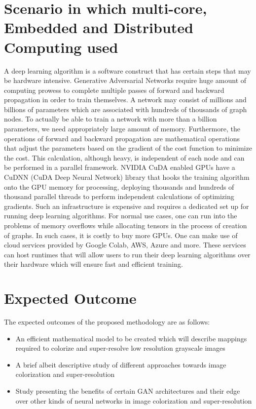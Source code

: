 \documentclass[oneside,a4paper,12pt]{report}
\begin{document}
\section{Scenario in which multi-core, Embedded and Distributed Computing used}
\hspace*{0.25 in}A deep learning algorithm is a software construct that has certain steps that may be hardware intensive. Generative Adversarial Networks require huge amount of computing prowess to complete multiple passes of forward and backward propagation in order to train themselves. A network may consist of millions and billions of parameters which are associated with hundreds of thousands of graph nodes. To actually be able to train a network with more than a billion parameters, we need appropriately large amount of memory. Furthermore, the operations of forward and backward propagation are mathematical operations that adjust the parameters based on the gradient of the cost function to minimize the cost. This calculation, although heavy, is independent of each node and can be performed in a parallel framework. NVIDIA CuDA enabled GPUs have a CuDNN (CuDA Deep Neural Network) library that hooks the training algorithm onto the GPU memory for processing, deploying thousands and hundreds of thousand parallel threads to perform independent calculations of optimizing gradients. Such an infrastructure is expensive and requires a dedicated set up for running deep learning algorithms. For normal use cases, one can run into the problems of memory overflows while allocating tensors in the process of creation of graphs. In such cases, it is costly to buy more GPUs. One can make use of cloud services provided by Google Colab, AWS, Azure and more. These services can host runtimes that will allow users to run their deep learning algorithms over their hardware which will ensure fast and efficient training.


\section{Expected Outcome}
\hspace*{0.25 in}The expected outcomes of the proposed methodology are as follows:
\begin{itemize}
\item An efficient mathematical model to be created which will describe mappings required to colorize and super-resolve low resolution grayscale images
\item A brief albeit descriptive study of different approaches towards image colorization and super-resolution
\item Study presenting the benefits of certain GAN architectures and their edge over other kinds of neural networks in image colorization and super-resolution
\end{itemize}
\end{document}
